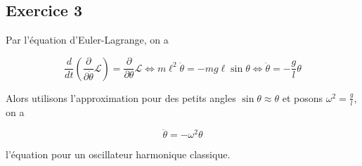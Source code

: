 \documentclass[french]{article}
\begin{document}
	\subsection*{Exercice 3}
	
	Par l'équation d'Euler-Lagrange, on a
	
	\begin{equation}
		\frac{d}{dt} \left(\frac{\partial}{\partial \dot{\theta}} \mathcal{L}\right) = \frac{\partial}{\partial \theta} \mathcal{L} \iff m \ell^2 \ddot{\theta} = -mg\ell \sin\theta \iff \ddot{\theta} = -\frac{g}{l} \theta
	\end{equation}
	
	Alors utilisons l'approximation pour des petits angles $\sin \theta \approx \theta$ et posons $\omega^2 = \frac{g}{l}$, on a
	
	\begin{equation}
		\ddot{\theta} = -\omega^2 \theta
	\end{equation}
	
	l'équation pour un oscillateur harmonique classique.
	
\end{document}
